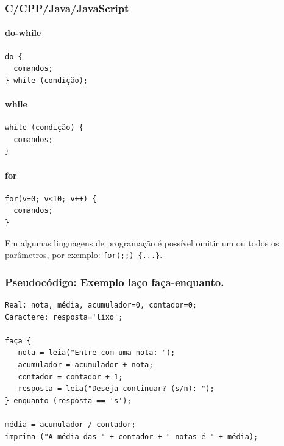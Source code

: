 \documentclass[12pt,a4paper]{article}
\begin{document}
    \hypertarget{ccppjavajavascript}{%
\subsubsection{C/CPP/Java/JavaScript}\label{ccppjavajavascript}}

    \hypertarget{do-while}{%
\paragraph{do-while}\label{do-while}}

    \begin{verbatim}
do { 
  comandos;
} while (condição);
\end{verbatim}

    \hypertarget{while}{%
\paragraph{while}\label{while}}

    \begin{verbatim}
while (condição) { 
  comandos;
}
\end{verbatim}

    \hypertarget{for}{%
\paragraph{for}\label{for}}

    \begin{verbatim}
for(v=0; v<10; v++) {
  comandos;
}
\end{verbatim}

Em algumas linguagens de programação é possível omitir um ou todos os
parâmetros, por exemplo: \texttt{for(;;)\ \{...\}}.

    \hypertarget{pseudocuxf3digo-exemplo-lauxe7o-fauxe7a-enquanto.}{%
\subsubsection{Pseudocódigo: Exemplo laço
faça-enquanto.}\label{pseudocuxf3digo-exemplo-lauxe7o-fauxe7a-enquanto.}}

\begin{verbatim}
Real: nota, média, acumulador=0, contador=0;
Caractere: resposta='lixo';

faça {
   nota = leia("Entre com uma nota: ");
   acumulador = acumulador + nota;
   contador = contador + 1;
   resposta = leia("Deseja continuar? (s/n): ");
} enquanto (resposta == 's');

média = acumulador / contador;
imprima ("A média das " + contador + " notas é " + média);
\end{verbatim}
\end{document}
